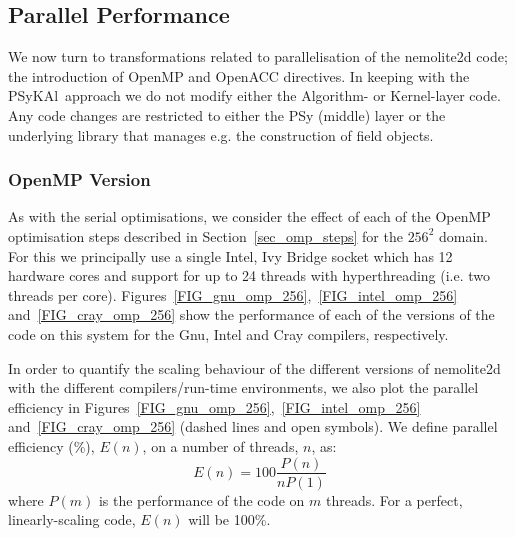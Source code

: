 \documentclass[journal]{IEEEtran}
\newcommand{\psykal}{{PS}y{KA}l\ }
\begin{document}
%
%



\subsection{Parallel Performance}

We now turn to transformations related to parallelisation of the
nemolite2d code; the introduction of OpenMP and OpenACC directives. In
keeping with the \psykal approach we do not modify either the
Algorithm- or Kernel-layer code.  Any code changes are restricted to
either the PSy (middle) layer or the underlying library that manages
e.g. the construction of field objects.

\subsubsection{OpenMP Version}

As with the serial optimisations, we consider the effect of each of
the OpenMP optimisation steps described in Section~\ref{sec_omp_steps}
for the $256^2$ domain. For this we principally use a single Intel,
Ivy Bridge socket which has 12 hardware cores and support for up to 24
threads with hyperthreading (i.e. two threads per core).
Figures~\ref{FIG_gnu_omp_256},~\ref{FIG_intel_omp_256}
and~\ref{FIG_cray_omp_256} show the performance of each of the
versions of the code on this system for the Gnu, Intel and Cray
compilers, respectively.

In order to quantify the scaling behaviour of the different versions
of nemolite2d with the different compilers/run-time environments, we
also plot the parallel efficiency in
Figures~\ref{FIG_gnu_omp_256},~\ref{FIG_intel_omp_256}
and~\ref{FIG_cray_omp_256} (dashed lines and open symbols). We define
parallel efficiency (\%), $E(n)$, on a number of threads, $n$, as:
\[
E(n) = 100  \frac{P(n)}{ n P(1)}
\]
where $P(m)$ is the performance of the code on $m$ threads. For a
perfect, linearly-scaling code, $E(n)$ will be 100\%.
\end{document}
